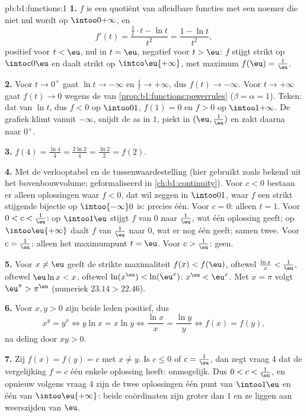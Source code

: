 \begin{solution}{pb:b1:functions:1}
\textbf{1.} $f$ is een quotiënt van afleidbare functies met een noemer
die niet nul wordt op $\intoo0{+\infty}$, en
\[
f'(t) = \frac{\frac1t \cdot t - \ln t}{t^2} = \frac{1 - \ln
t}{t^2} ,
\]
positief voor $t < \eu$, nul in $t = \eu$, negatief voor $t > \eu$: $f$
stijgt strikt op $\intoc0\eu$ en daalt strikt op $\intco\eu{+\infty}$,
met maximum $f(\eu) = \frac1\eu$.

\textbf{2.} Voor $t \to 0^+$ gaat $\ln t \to -\infty$ en $\frac1t \to
+\infty$, dus $f(t) \to -\infty$. Voor $t \to +\infty$ gaat $f(t) \to 0$
wegens de  van \cref{prop:b1:functions:powerrules}
($\beta = \alpha = 1$). Teken: dat van $\ln t$, dus $f < 0$ op
$\intoo01$, $f(1) = 0$ en $f > 0$ op $\intoo1{+\infty}$. De grafiek
klimt vanuit $-\infty$, snijdt de as in $1$, piekt in $(\eu,
\frac1\eu)$ en zakt daarna naar $0^+$.

\textbf{3.} $f(4) = \frac{\ln 4}4 = \frac{2\ln 2}4 = \frac{\ln 2}2 =
f(2)$.

\textbf{4.} Met de verlooptabel en de tussenwaardestelling (hier
gebruikt zoals bekend uit het bovenbouwvolume; geformaliseerd in
\cref{ch:b1:continuity}). Voor $c < 0$ bestaan er alleen oplossingen waar
$f < 0$, dat wil zeggen in $\intoo01$, waar $f$ een strikt stijgende
bijectie op $\intoo{-\infty}0$ is: precies één. Voor $c = 0$: alleen
$t = 1$. Voor $0 < c < \frac1\eu$: op $\intoo1\eu$ stijgt $f$ van $0$
naar $\frac1\eu$, wat één oplossing geeft; op $\intoo\eu{+\infty}$ daalt
$f$ van $\frac1\eu$ naar $0$, wat er nog één geeft; samen twee. Voor $c
= \frac1\eu$: alleen het maximumpunt $t = \eu$. Voor $c > \frac1\eu$:
geen.

\textbf{5.} Voor $x \neq \eu$ geeft de strikte maximaliteit $f(x) <
f(\eu)$, oftewel $\frac{\ln x}x < \frac1\eu$, oftewel $\eu\ln x < x$,
oftewel $\ln(x^\eu) < \ln(\eu^x)$: $x^\eu < \eu^x$. Met $x = \pi$ volgt
$\eu^\pi > \pi^\eu$ (numeriek $23.14 > 22.46$).

\textbf{6.} Voor $x, y > 0$ zijn beide leden positief, dus
\[
x^y = y^x \iff y\ln x = x\ln y \iff \frac{\ln x}x = \frac{\ln y}y
\iff f(x) = f(y) ,
\]
na deling door $xy > 0$.

\textbf{7.} Zij $f(x) = f(y) = c$ met $x \neq y$. Is $c \leq 0$ of $c =
\frac1\eu$, dan zegt vraag 4 dat de vergelijking $f = c$ één enkele
oplossing heeft: onmogelijk. Dus $0 < c < \frac1\eu$, en opnieuw volgens
vraag 4 zijn de twee oplossingen één punt van $\intoo1\eu$ en één van
$\intoo\eu{+\infty}$: beide coördinaten zijn groter dan $1$ en ze
liggen aan weerszijden van $\eu$.


\end{solution}

